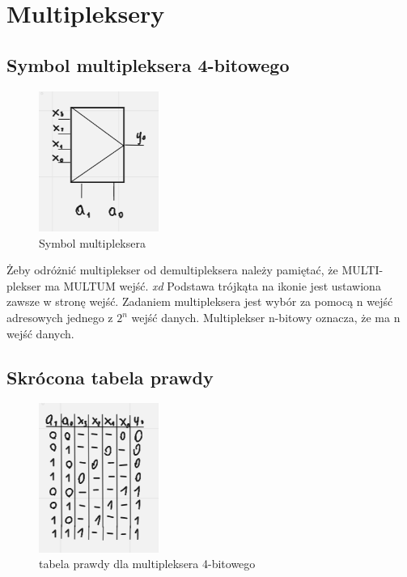 \section{Multipleksery}

\subsection{Symbol multipleksera 4-bitowego}

\begin{figure}[h!]
    \centering
    \includegraphics[width=0.35\textwidth]{images/mux/mux_s.png}
    \caption{Symbol multipleksera}
    \label{fig:my_label}
\end{figure}

Żeby odróżnić multiplekser od demultipleksera należy pamiętać, że MULTI-plekser ma MULTUM wejść. \textit{xd}
Podstawa trójkąta na ikonie jest ustawiona zawsze w stronę wejść. Zadaniem  multipleksera jest wybór za pomocą n wejść adresowych jednego z $2^n$ wejść danych. Multiplekser n-bitowy oznacza, że ma n wejść danych.

\subsection{Skrócona tabela prawdy}

\begin{figure}[h!]
    \centering
    \includegraphics[width = 0.35\textwidth]{images/mux/mux_t.png}
    \caption{tabela prawdy dla multipleksera 4-bitowego}
    \label{fig:my_label}
\end{figure}

